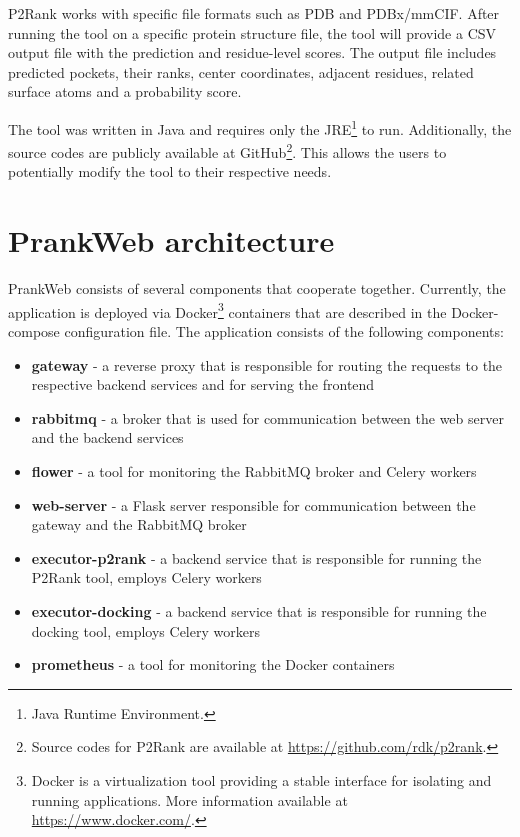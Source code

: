 P2Rank works with specific file formats such as PDB and PDBx/mmCIF. After running the tool on a specific protein structure file, the tool will provide a CSV output file with the prediction and residue-level scores. The output file includes predicted pockets, their ranks, center coordinates, adjacent residues, related surface atoms and a probability score.

The tool was written in Java and requires only the JRE\footnote{Java Runtime Environment.} to run. Additionally, the source codes are publicly available at GitHub\footnote{Source codes for P2Rank are available at \url{https://github.com/rdk/p2rank}.}. This allows the users to potentially modify the tool to their respective needs. 

\section{PrankWeb architecture}
\label{sec:prankweb_arch}

PrankWeb consists of several components that cooperate together. Currently, the application is deployed via Docker\footnote{Docker is a virtualization tool providing a stable interface for isolating and running applications. More information available at \url{https://www.docker.com/}.} containers that are described in the Docker-compose configuration file. The application consists of the following components:

\begin{itemize}
    \item \textbf{gateway} - a reverse proxy that is responsible for routing the requests to the respective backend services and for serving the frontend
    \item \textbf{rabbitmq} - a broker that is used for communication between the web server and the backend services
    \item \textbf{flower} - a tool for monitoring the RabbitMQ broker and Celery workers
    \item \textbf{web-server} - a Flask server responsible for communication between the gateway and the RabbitMQ broker
    \item \textbf{executor-p2rank} - a backend service that is responsible for running the P2Rank tool, employs Celery workers
    \item \textbf{executor-docking} - a backend service that is responsible for running the docking tool, employs Celery workers 
    \item \textbf{prometheus} - a tool for monitoring the Docker containers 
\end{itemize}

